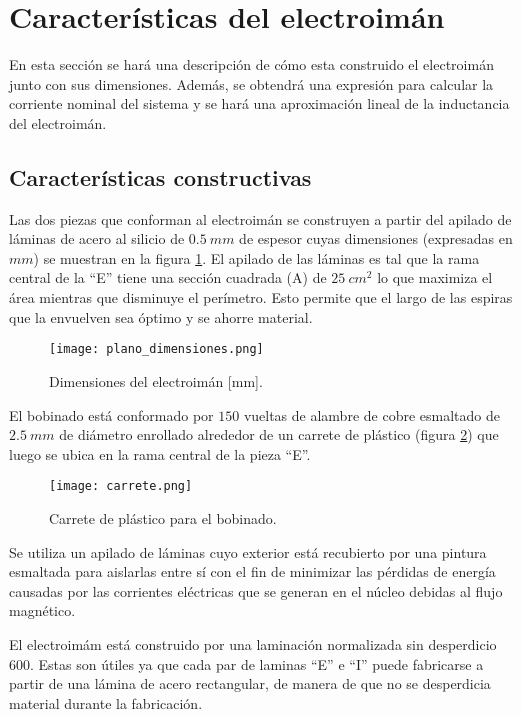 \section{Características del electroimán} \label{section_disenio_electroimán}

En esta sección se hará una descripción de cómo esta construido el electroimán junto con sus dimensiones. Además, se obtendrá una expresión para calcular la corriente nominal del sistema y se hará una aproximación lineal de la inductancia del electroimán.
 
\subsection{Características constructivas}\label{section_caract_constructivas}

Las dos piezas que conforman al electroimán se construyen a partir del apilado de láminas de acero al silicio de $0.5\:mm$ de espesor cuyas dimensiones (expresadas en $mm$) se muestran en la figura \ref{fig:img_plano_dimensiones}. El apilado de las láminas es tal que la rama central de la “E” tiene una sección cuadrada (A) de $25\:cm^{2}$ lo que maximiza el área mientras que disminuye el perímetro. Esto permite que el largo de las espiras que la envuelven sea óptimo y se ahorre material.

\begin{figure}[H]
	\centering
	\texttt{[image: plano\_dimensiones.png]}
	\caption{Dimensiones del electroimán [mm].}
	\label{fig:img_plano_dimensiones}
\end{figure}

\noindent El bobinado está conformado por $150$ vueltas de alambre de cobre esmaltado de $2.5\:mm$ de diámetro enrollado alrededor de un carrete de plástico (figura \ref{fig:img_carrete}) que luego se ubica en la rama central de la pieza ``E''.

\begin{figure}[H]
	\centering
	\texttt{[image: carrete.png]}
	\caption{Carrete de plástico para el bobinado.}
	\label{fig:img_carrete}
\end{figure}


\noindent Se utiliza un apilado de láminas cuyo exterior está recubierto por una pintura esmaltada para aislarlas entre sí con el fin de minimizar las pérdidas de energía causadas por las corrientes eléctricas que se generan en el núcleo debidas al flujo magnético. 

\noindent El electroimám está construido por una laminación normalizada sin desperdicio 600. Estas son útiles ya que cada par de laminas ``E'' e ``I'' puede fabricarse a partir de una lámina de acero rectangular, de manera de que no se desperdicia material durante la fabricación. 


